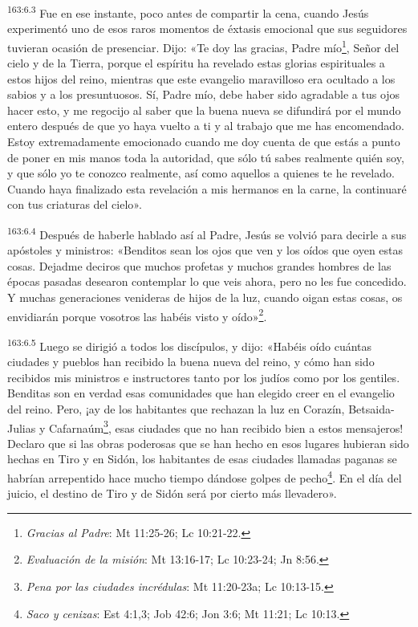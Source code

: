 \par 
\textsuperscript{163:6.3} Fue en ese instante, poco antes de compartir la cena, cuando Jesús experimentó uno de esos raros momentos de éxtasis emocional que sus seguidores tuvieran ocasión de presenciar. Dijo: «Te doy las gracias, Padre mío\footnote{\textit{Gracias al Padre}: Mt 11:25-26; Lc 10:21-22.}, Señor del cielo y de la Tierra, porque el espíritu ha revelado estas glorias espirituales a estos hijos del reino, mientras que este evangelio maravilloso era ocultado a los sabios y a los presuntuosos. Sí, Padre mío, debe haber sido agradable a tus ojos hacer esto, y me regocijo al saber que la buena nueva se difundirá por el mundo entero después de que yo haya vuelto a ti y al trabajo que me has encomendado. Estoy extremadamente emocionado cuando me doy cuenta de que estás a punto de poner en mis manos toda la autoridad, que sólo tú sabes realmente quién soy, y que sólo yo te conozco realmente, así como aquellos a quienes te he revelado. Cuando haya finalizado esta revelación a mis hermanos en la carne, la continuaré con tus criaturas del cielo».

\par 
\textsuperscript{163:6.4} Después de haberle hablado así al Padre, Jesús se volvió para decirle a sus apóstoles y ministros: «Benditos sean los ojos que ven y los oídos que oyen estas cosas. Dejadme deciros que muchos profetas y muchos grandes hombres de las épocas pasadas desearon contemplar lo que veis ahora, pero no les fue concedido. Y muchas generaciones venideras de hijos de la luz, cuando oigan estas cosas, os envidiarán porque vosotros las habéis visto y oído»\footnote{\textit{Evaluación de la misión}: Mt 13:16-17; Lc 10:23-24; Jn 8:56.}.

\par 
\textsuperscript{163:6.5} Luego se dirigió a todos los discípulos, y dijo: «Habéis oído cuántas ciudades y pueblos han recibido la buena nueva del reino, y cómo han sido recibidos mis ministros e instructores tanto por los judíos como por los gentiles. Benditas son en verdad esas comunidades que han elegido creer en el evangelio del reino. Pero, ¡ay de los habitantes que rechazan la luz en Corazín, Betsaida-Julias y Cafarnaúm\footnote{\textit{Pena por las ciudades incrédulas}: Mt 11:20-23a; Lc 10:13-15.}, esas ciudades que no han recibido bien a estos mensajeros! Declaro que si las obras poderosas que se han hecho en esos lugares hubieran sido hechas en Tiro y en Sidón, los habitantes de esas ciudades llamadas paganas se habrían arrepentido hace mucho tiempo dándose golpes de pecho\footnote{\textit{Saco y cenizas}: Est 4:1,3; Job 42:6; Jon 3:6; Mt 11:21; Lc 10:13.}. En el día del juicio, el destino de Tiro y de Sidón será por cierto más llevadero».

